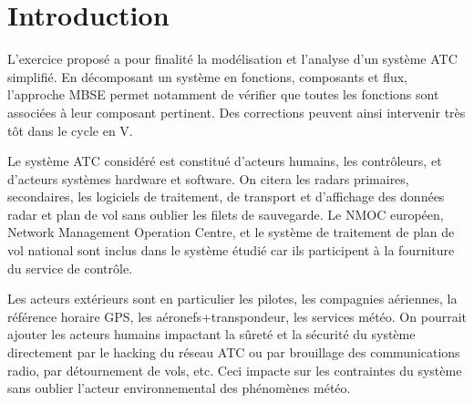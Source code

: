 
\pagebreak

\section*{Introduction}

L'exercice proposé a pour finalité la modélisation et l'analyse d'un système ATC simplifié. En décomposant un système en fonctions, composants et flux, l'approche MBSE permet notamment de vérifier que toutes les fonctions sont associées à leur composant pertinent. Des corrections peuvent ainsi intervenir très tôt dans le cycle en V.

Le système ATC considéré est constitué d'acteurs humains, les contrôleurs, et d'acteurs systèmes
hardware et software. On citera les radars primaires, secondaires, les logiciels de traitement, de transport et d'affichage des données radar et plan de vol sans oublier les filets de sauvegarde. Le NMOC européen, Network Management Operation Centre, et le système de traitement de plan de vol national sont inclus dans le système étudié car ils participent à la fourniture du service de contrôle.

Les acteurs extérieurs sont en particulier les pilotes, les compagnies aériennes, la référence horaire GPS, les aéronefs+transpondeur, les services météo. On pourrait ajouter les acteurs humains impactant la sûreté et la sécurité du système directement par le hacking du réseau ATC ou par brouillage des communications radio, par détournement de vols, etc. Ceci impacte sur les contraintes du système sans oublier l'acteur environnemental des phénomènes météo. 








